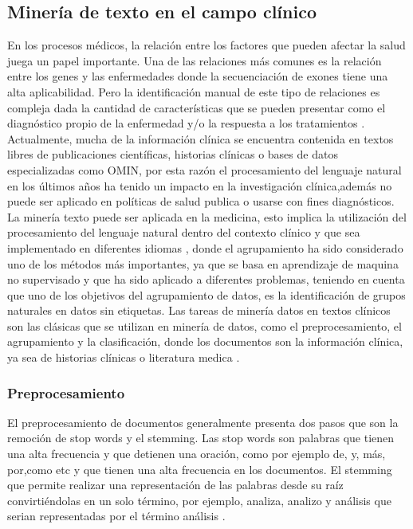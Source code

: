 {\subsection{Minería de texto en el campo clínico}

En los procesos médicos, la relación entre los factores que pueden afectar la salud juega un papel importante. Una de las relaciones más comunes es la relación entre los genes y las enfermedades donde la secuenciación de exones tiene una alta aplicabilidad. Pero la identificación manual de este tipo de relaciones es compleja dada la cantidad de características que se pueden presentar como el diagnóstico propio de la enfermedad y/o la respuesta a los tratamientos \cite{Kawashima2017}.\\

Actualmente, mucha de la información clínica se encuentra contenida en textos libres de publicaciones científicas, historias clínicas o bases de datos especializadas como OMIN, por esta razón el procesamiento del lenguaje natural en los últimos años ha tenido un impacto en la investigación clínica,además no puede ser aplicado en políticas de salud publica o usarse con fines diagnósticos. \cite{Neveol2014}\\

La minería texto puede ser aplicada en la medicina, esto implica la utilización del procesamiento del lenguaje natural dentro del contexto clínico y que sea implementado en diferentes idiomas \cite{Neveol2014}, donde el agrupamiento ha sido considerado uno de los métodos más importantes, ya que se basa en aprendizaje de maquina no supervisado y que ha sido aplicado a diferentes problemas\cite{Kawashima2017}, teniendo en cuenta que uno de los objetivos del agrupamiento de datos, es la  identificación de grupos naturales en datos sin etiquetas. Las tareas de minería datos en textos clínicos son las clásicas que se utilizan en minería de datos, como el preprocesamiento, el agrupamiento y la clasificación, donde los documentos son la información clínica, ya sea de historias clínicas o literatura medica \cite{Jain2010,Renganathan2017}.


\subsubsection{Preprocesamiento}

El preprocesamiento de documentos generalmente presenta dos pasos que son la remoción de stop words y el stemming. Las stop words son palabras que tienen una alta frecuencia y  que detienen una oración, como por ejemplo de, y, más, por,como etc y que tienen una alta frecuencia en los documentos. El stemming  que permite realizar una representación de las palabras desde su raíz convirtiéndolas en un solo término, por ejemplo, analiza, analizo y análisis que serian representadas por el término análisis \cite{Renganathan2017}.\\

}
